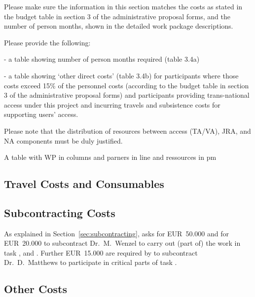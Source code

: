 \begin{todo}{}\color{red}
Please make sure the information in this section matches the costs as stated in the budget table in section 3 of the administrative proposal forms, and the number of person months, shown in the detailed work package descriptions.

Please provide the following:

- a table showing number of person months required (table 3.4a)

- a table showing ‘other direct costs’ (table 3.4b) for participants where those  costs exceed 15\% of the personnel costs (according to the budget  table in section 3 of the administrative proposal forms) and participants providing trans-national access under this project and incurring travels and subsistence costs for supporting users' access.

Please note that the distribution of resources between access (TA/VA), JRA, and NA components must be duly justified.
\end{todo}


{\color{red} A table with WP in columns and parners in line and
  ressources in pm}

\subsection{Travel Costs and Consumables}\label{sec:travel-costs}

\subsection{Subcontracting Costs}\label{sec:subcontracting-costs}

As explained in Section~\ref{sec:subcontracting},  asks for
EUR~50.000 and  for EUR~20.000 to subcontract Dr.\ M.\ Wenzel to
carry out (part of) the work in task
,  and
. Further EUR~15.000 are required
by  to subcontract Dr.\ D.\ Matthews to participate in
critical parts of task .




\subsection{Other Costs}


